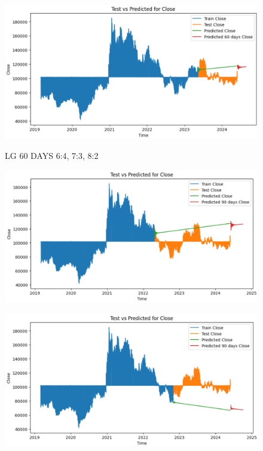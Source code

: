 \documentclass{article}
\begin{document}
\begin{multicols}{2}
\begin{figure}[H]
\begin{minipage}{0.15\textwidth}
    \label{fig:2}
    \end{minipage}%
    \begin{minipage}{0.15\textwidth}
    \centering
    \includegraphics[width=1\textwidth]{Image/VARMA/LG/8_2/60.png}

    \label{fig:3}
    \end{minipage}
    \caption{LG 60 DAYS  6:4, 7:3, 8:2 }
\end{figure}

\begin{figure}[H]
    \centering
    \begin{minipage}{0.15\textwidth}
    \centering
    \includegraphics[width=1\textwidth]{Image/VARMA/LG/6_4/90.png}
   
    \label{fig:1}
    \end{minipage}%
    \begin{minipage}{0.15\textwidth}
    \centering
    \includegraphics[width=1\textwidth]{Image/VARMA/LG/7_3/90.png}
  

\end{minipage}
\end{figure}
\end{multicols}
\end{document}
